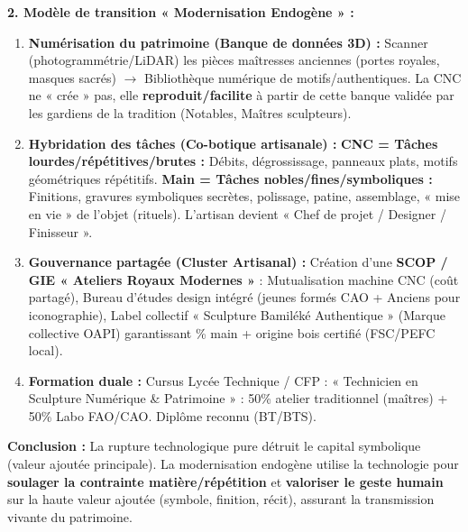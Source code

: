 \documentclass[11pt]{article}
\begin{document}
\begin{exoresolu}
\textbf{2. Modèle de transition « Modernisation Endogène » :}
\begin{enumerate}
    \item \textbf{Numérisation du patrimoine (Banque de données 3D) :} Scanner (photogrammétrie/LiDAR) les pièces maîtresses anciennes (portes royales, masques sacrés) $\rightarrow$ Bibliothèque numérique de motifs/authentiques. La CNC ne « crée » pas, elle \textbf{reproduit/facilite} à partir de cette banque validée par les gardiens de la tradition (Notables, Maîtres sculpteurs).
    \item \textbf{Hybridation des tâches (Co-botique artisanale) :} \textbf{CNC = Tâches lourdes/répétitives/brutes :} Débits, dégrossissage, panneaux plats, motifs géométriques répétitifs. \textbf{Main = Tâches nobles/fines/symboliques :} Finitions, gravures symboliques secrètes, polissage, patine, assemblage, « mise en vie » de l'objet (rituels). L'artisan devient « Chef de projet / Designer / Finisseur ».
    \item \textbf{Gouvernance partagée (Cluster Artisanal) :} Création d'une \textbf{SCOP / GIE « Ateliers Royaux Modernes »} : Mutualisation machine CNC (coût partagé), Bureau d'études design intégré (jeunes formés CAO + Anciens pour iconographie), Label collectif « Sculpture Bamiléké Authentique » (Marque collective OAPI) garantissant \% main + origine bois certifié (FSC/PEFC local).
    \item \textbf{Formation duale :} Cursus Lycée Technique / CFP : « Technicien en Sculpture Numérique \& Patrimoine » : 50\% atelier traditionnel (maîtres) + 50\% Labo FAO/CAO. Diplôme reconnu (BT/BTS).
\end{enumerate}
\textbf{Conclusion :} La rupture technologique pure détruit le capital symbolique (valeur ajoutée principale). La modernisation endogène utilise la technologie pour \textbf{soulager la contrainte matière/répétition} et \textbf{valoriser le geste humain} sur la haute valeur ajoutée (symbole, finition, récit), assurant la transmission vivante du patrimoine.
\end{exoresolu}
\end{document}
